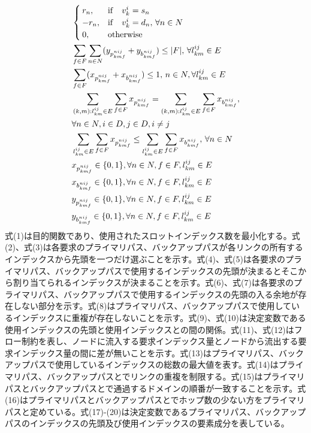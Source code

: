 \documentclass[a4j,twocolumn,fleqn]{jarticle}
\begin{document}
\begin{eqnarray}
	&\begin{cases}
	r_n,&{\rm if}\quad v^i_k = s_n\\
	-r_n,&{\rm if}\quad v^i_k = d_n,\, \forall n\in N\\ %
	0,&{\rm otherwise}
	\end{cases}\\
	&\displaystyle \sum_{f \in F}\sum_{n \in N}(y_{p^{nij}_{kmf}} + y_{b^{nij}_{kmf}}) \leq |F|,\, \forall l^{ij}_{km} \in E \\%
	&\displaystyle \sum_{f \in F}(x_{p^{nij}_{kmf}}+x_{b^{nij}_{kmf}}) \leq 1,\, n \in N,\forall l^{ij}_{km} \in E\\%
	&\displaystyle \sum_{(k,m):l^{ij}_{km} \in E}\sum_{f \in F}x_{p^{nij}_{kmf}} =\sum_{(k,m):l^{ij}_{km} \in E}\sum_{f \in F}x_{b^{nij}_{kmf}},\nonumber\\
	&\displaystyle \forall n \in N,i \in D,j \in D,i \neq j\\%
	&\displaystyle \sum_{l^{ij}_{km} \in E}\sum_{f \in F}x_{p^{nij}_{kmf}} \leq \sum_{l^{ij}_{km} \in E}\sum_{f \in F}x_{b^{nij}_{kmf}},\, \forall n\in N\\%
	&\displaystyle x_{p^{nij}_{kmf}} \in \{0,1\},\forall n \in N,f \in F,l^{ij}_{km}\in E\\
	&\displaystyle x_{b^{nij}_{kmf}} \in \{0,1\},\forall n \in N,f \in F,l^{ij}_{km}\in E\\
	&\displaystyle y_{p^{nij}_{kmf}} \in \{0,1\},\forall n \in N,f \in F,l^{ij}_{km}\in E\\
	&\displaystyle y_{b^{nij}_{kmf}} \in \{0,1\},\forall n \in N,f \in F,l^{ij}_{km}\in E
\end{eqnarray}
式(1)は目的関数であり、使用されたスロットインデックス数を最小化する。式(2)、式(3)は各要求のプライマリパス、バックアップパスが各リンクの所有するインデックスから先頭を一つだけ選ぶことを示す。式(4)、式(5)は各要求のプライマリパス、バックアップパスで使用するインデックスの先頭が決まるとそこから割り当てられるインデックスが決まることを示す。式(6)、式(7)は各要求のプライマリパス、バックアップパスで使用するインデックスの先頭の入る余地が存在しない部分を示す。式(8)はプライマリパス、バックアップパスで使用しているインデックスに重複が存在しないことを示す。式(9)、式(10)は決定変数である使用インデックスの先頭と使用インデックスとの間の関係。式(11)、式(12)はフロー制約を表し、ノードに流入する要求インデックス量とノードから流出する要求インデックス量の間に差が無いことを示す。式(13)はプライマリパス、バックアップパスで使用しているインデックスの総数の最大値を表す。式(14)はプライマリパス、バックアップパスとでリンクの重複を制限する。式(15)はプライマリパスとバックアップパスとで通過するドメインの順番が一致することを示す。式(16)はプライマリパスとバックアップパスとでホップ数の少ない方をプライマリパスと定めている。式(17)-(20)は決定変数であるプライマリパス、バックアップパスのインデックスの先頭及び使用インデックスの要素成分を表している。
\end{document}
